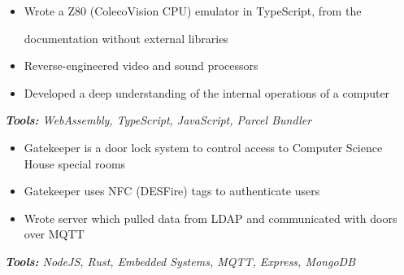 \documentclass[10pt,letter]{altacv}
\begin{document}

\begin{fullwidth}
\marginpar{\makesidebarheader}
    \vspace*{-1\baselineskip}
\makecvheader
\end{fullwidth}

\bigskip
\smallskip


\begin{itemize}
\item Wrote a Z80 (ColecoVision CPU) emulator in TypeScript, from the

  documentation without external libraries
\item Reverse-engineered video and sound processors
\item Developed a deep understanding of the internal operations of a computer
\end{itemize}
\textit{\textbf{Tools:} WebAssembly, TypeScript, JavaScript, Parcel Bundler}

\divider
  
\begin{itemize}
\item Gatekeeper is a door lock system to control access to Computer Science House special rooms
\item Gatekeeper uses NFC (DESFire) tags to authenticate users
\item Wrote server which pulled data from LDAP and communicated with doors over MQTT
\end{itemize}
\textit{\textbf{Tools:} NodeJS, Rust, Embedded Systems, MQTT, Express, MongoDB}
\end{document}

